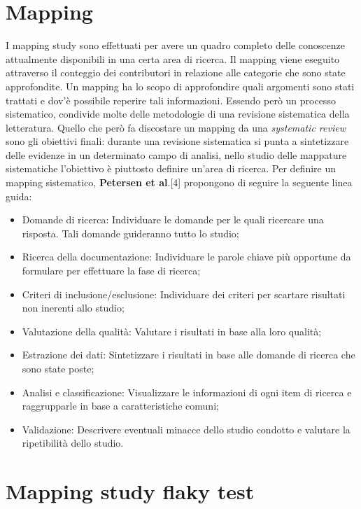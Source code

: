 \fancyhead[C]{}
\section{Mapping}
I mapping study sono effettuati per avere un quadro completo
delle conoscenze attualmente disponibili in una certa area di ricerca. Il mapping viene eseguito attraverso il conteggio dei contributori in relazione alle categorie che sono state approfondite. Un mapping ha lo scopo di approfondire quali argomenti
sono stati trattati e dov’è possibile reperire tali informazioni. Essendo però un processo sistematico, condivide molte delle metodologie di una revisione sistematica della letteratura. Quello che però fa discostare un mapping da una
\emph{systematic review} sono gli obiettivi finali: durante una revisione sistematica si punta a sintetizzare delle evidenze in un determinato campo di analisi, nello studio delle
mappature sistematiche l’obiettivo è piuttosto definire un'area di ricerca.
Per definire un mapping sistematico, \textbf{Petersen et al}.[4] propongono di seguire la seguente linea guida:
\begin{itemize}
	\item Domande di ricerca: Individuare le domande per le quali ricercare una risposta. Tali domande guideranno tutto lo studio;
	\item Ricerca della documentazione: Individuare le parole chiave più opportune da formulare per effettuare la fase di ricerca;
	\item Criteri di inclusione/esclusione: Individuare dei criteri per scartare risultati non inerenti allo studio;
	\item Valutazione della qualità: Valutare i risultati in base alla loro qualità;
	\item Estrazione dei dati: Sintetizzare i risultati in base alle domande di ricerca che sono state poste;
	\item Analisi e classificazione: Visualizzare le informazioni di ogni item di ricerca e raggrupparle in base a caratteristiche comuni;
	\item Validazione: Descrivere eventuali minacce dello studio condotto e valutare la ripetibilità dello studio.
\end{itemize}
\section{Mapping study flaky test}
